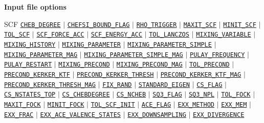 \begin{frame}[allowframebreaks]{\textbf{Input file options}}
\begin{block}{SCF}
\hyperlink{CHEB_DEGREE}{\texttt{CHEB\_DEGREE}} $\vert$ 
\hyperlink{CHEFSI_BOUND_FLAG}{\texttt{CHEFSI\_BOUND\_FLAG}} $\vert$ 
\hyperlink{RHO_TRIGGER}{\texttt{RHO\_TRIGGER}} $\vert$ 
\hyperlink{MAXIT_SCF}{\texttt{MAXIT\_SCF}} $\vert$ 
\hyperlink{MINIT_SCF}{\texttt{MINIT\_SCF}} $\vert$ 
\hyperlink{TOL_SCF}{\texttt{TOL\_SCF}} $\vert$ 
\hyperlink{SCF_FORCE_ACC}{\texttt{SCF\_FORCE\_ACC}} $\vert$ 
\hyperlink{SCF_ENERGY_ACC}{\texttt{SCF\_ENERGY\_ACC}} $\vert$ 
\hyperlink{TOL_LANCZOS}{\texttt{TOL\_LANCZOS}} $\vert$ 
\hyperlink{MIXING_VARIABLE}{\texttt{MIXING\_VARIABLE}} $\vert$ 
\hyperlink{MIXING_HISTORY}{\texttt{MIXING\_HISTORY}} $\vert$ 
\hyperlink{MIXING_PARAMETER}{\texttt{MIXING\_PARAMETER}} $\vert$ 
\hyperlink{MIXING_PARAMETER_SIMPLE}{\texttt{MIXING\_PARAMETER\_SIMPLE}} $\vert$ 
\hyperlink{MIXING_PARAMETER_MAG}{\texttt{MIXING\_PARAMETER\_MAG}} $\vert$ 
\hyperlink{MIXING_PARAMETER_SIMPLE_MAG}{\texttt{MIXING\_PARAMETER\_SIMPLE\_MAG}} $\vert$ 
\hyperlink{PULAY_FREQUENCY}{\texttt{PULAY\_FREQUENCY}} $\vert$ 
\hyperlink{PULAY_RESTART}{\texttt{PULAY\_RESTART}} $\vert$ 
\hyperlink{MIXING_PRECOND}{\texttt{MIXING\_PRECOND}} $\vert$ 
\hyperlink{MIXING_PRECOND_MAG}{\texttt{MIXING\_PRECOND\_MAG}} $\vert$ 
\hyperlink{TOL_PRECOND}{\texttt{TOL\_PRECOND}} $\vert$ 
\hyperlink{PRECOND_KERKER_KTF}{\texttt{PRECOND\_KERKER\_KTF}} $\vert$ 
\hyperlink{PRECOND_KERKER_THRESH}{\texttt{PRECOND\_KERKER\_THRESH}} $\vert$ 
\hyperlink{PRECOND_KERKER_KTF_MAG}{\texttt{PRECOND\_KERKER\_KTF\_MAG}} $\vert$ 
\hyperlink{PRECOND_KERKER_THRESH\_MAG}{\texttt{PRECOND\_KERKER\_THRESH\_MAG}} $\vert$ 
\hyperlink{FIX_RAND}{\texttt{FIX\_RAND}} $\vert$ 
\hyperlink{STANDARD_EIGEN}{\texttt{STANDARD\_EIGEN}} $\vert$ 
\hyperlink{CS_FLAG}{\texttt{CS\_FLAG}} $\vert$ 
\hyperlink{CS_NSTATES_TOP}{\texttt{CS\_NSTATES\_TOP}} $\vert$ 
\hyperlink{CS_CHEBDEGREE}{\texttt{CS\_CHEBDEGREE}} $\vert$ 
\hyperlink{CS_NCHEB}{\texttt{CS\_NCHEB}} $\vert$ 
\hyperlink{SQ3_FLAG}{\texttt{SQ3\_FLAG}} $\vert$ 
\hyperlink{SQ3_NPL}{\texttt{SQ3\_NPL}} $\vert$
\hyperlink{TOL_FOCK}{\texttt{TOL\_FOCK}} $\vert$ 
\hyperlink{MAXIT_FOCK}{\texttt{MAXIT\_FOCK}} $\vert$ 
\hyperlink{MINIT_FOCK}{\texttt{MINIT\_FOCK}} $\vert$ 
\hyperlink{TOL_SCF_INIT}{\texttt{TOL\_SCF\_INIT}} $\vert$ 
\hyperlink{ACE_FLAG}{\texttt{ACE\_FLAG}} $\vert$ 
\hyperlink{EXX_METHOD}{\texttt{EXX\_METHOD}} $\vert$ 
\hyperlink{EXX_MEM}{\texttt{EXX\_MEM}} $\vert$ 
\hyperlink{EXX_FRAC}{\texttt{EXX\_FRAC}} $\vert$ 
\hyperlink{EXX_ACE_VALENCE_STATES}{\texttt{EXX\_ACE\_VALENCE\_STATES}} $\vert$ 
\hyperlink{EXX_DOWNSAMPLING}{\texttt{EXX\_DOWNSAMPLING}} $\vert$ 
\hyperlink{EXX_DIVERGENCE}{\texttt{EXX\_DIVERGENCE}}
\end{block}
\end{frame}


